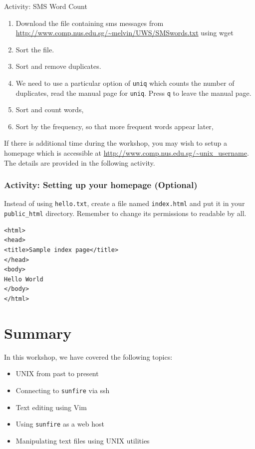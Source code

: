 \begin{frame}[allowframebreaks=0.6]{Activity: SMS Word Count}

\begin{enumerate}
\item Download the file containing sms messages from \url{http://www.comp.nus.edu.sg/~melvin/UWS/SMSwords.txt} using wget 
\item Sort the file.   
\item Sort and remove duplicates.    
\item We need to use a particular option of \texttt{uniq} which counts the
number of duplicates, read the manual page for \texttt{uniq}. Press \texttt{q}
to leave the manual page.    
\item Sort and count words,  
\item Sort by the frequency, so that more frequent words appear later, 
\end{enumerate}
\end{frame}

If there is additional time during the workshop, you may wish to setup a
homepage which is accessible at \url{http://www.comp.nus.edu.sg/~unix_username}.
The details are provided in the following activity.  

\begin{frame}[fragile]
\frametitle{Activity: Setting up your homepage (Optional)}
Instead of using \texttt{hello.txt}, create a file named \texttt{index.html} and
put it in your \texttt{public\_html} directory. Remember to change its
permissions to readable by all.  

\begin{verbatim}
<html>
<head>
<title>Sample index page</title>
</head>
<body>
Hello World
</body>
</html>
\end{verbatim}
\end{frame}

\section{Summary}

\begin{frame}
In this workshop, we have covered the following topics:
\begin{itemize}
\item UNIX from past to present
\item Connecting to \texttt{sunfire} via ssh
\item Text editing using Vim
\item Using \texttt{sunfire} as a web host
\item Manipulating text files using UNIX utilities
\end{itemize}
\end{frame}

